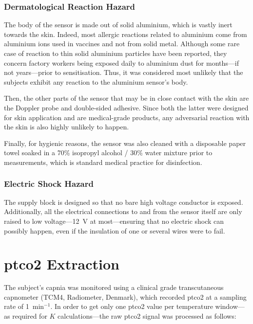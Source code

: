 \subsubsection{Dermatological Reaction Hazard}\label{annsect:dermato}

The body of the sensor is made out of solid aluminium, which is vastly inert towards the skin. Indeed, most allergic reactions related to aluminium come from aluminium ions used in vaccines and not from solid metal\cite{flint1998, hindsen2018}. Although some rare case of reaction to thin solid aluminium particles have been reported, they concern factory workers being exposed daily to aluminium dust for months---if not years---prior to sensitisation\cite{hall1944, peters1998}. Thus, it was considered most unlikely that the subjects exhibit any reaction to the aluminium sensor's body.

Then, the other parts of the sensor that may be in close contact with the skin are the Doppler probe and double-sided adhesive. Since both the latter were designed for skin application and are medical-grade products, any adversarial reaction with the skin is also highly unlikely to happen.

Finally, for hygienic reasons, the sensor was also cleaned with a disposable paper towel soaked in a 70\% isopropyl alcohol / 30\% water mixture prior to measurements, which is standard medical practice for disinfection.

\subsubsection{Electric Shock Hazard}

The supply block is designed so that no bare high voltage conductor is exposed. Additionally, all the electrical connections to and from the sensor itself are only raised to low voltage---12~V at most---ensuring that no electric shock can possibly happen, even if the insulation of one or several wires were to fail.

\section{\texorpdfstring{\gls{ptco2}}{tcpCO2} Extraction}

The subject's capnia was monitored using a clinical grade transcutaneous capnometer (TCM4, Radiometer, Denmark), which recorded \gls{ptco2} at a sampling rate of 1~min$^{-1}$. In order to get only one \gls{ptco2} value per temperature window---as required for $K$ calculations---the raw \gls{ptco2} signal was processed as follows:

